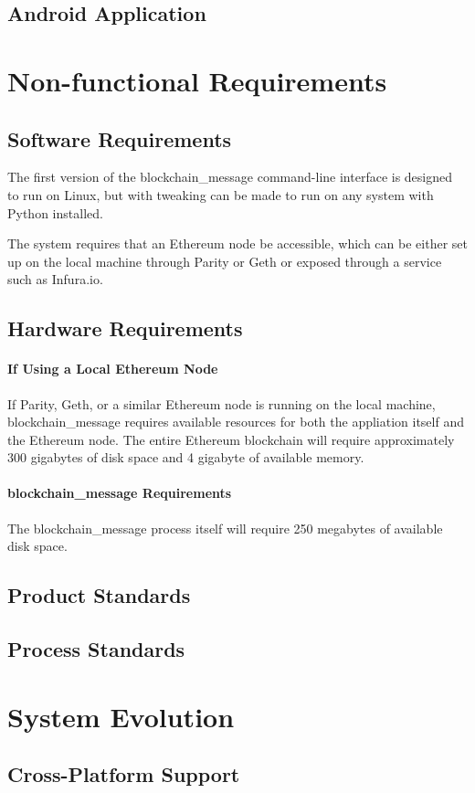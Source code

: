 \documentclass[titlepage]{report}
\begin{document}
\subsection{Android Application}

\section{Non-functional Requirements}
\subsection{Software Requirements}
The first version of the blockchain\_message command-line interface is designed to run on Linux, but with tweaking can be made to run on any system with Python installed. 

The system requires that an Ethereum node be accessible, which can be either set up on the local machine through Parity or Geth or exposed through a service such as Infura.io.

\subsection{Hardware Requirements}
\paragraph{If Using a Local Ethereum Node}
If Parity, Geth, or a similar Ethereum node is running on the local machine, blockchain\_message requires available resources for both the appliation itself and the Ethereum node. The entire Ethereum blockchain will require approximately 300 gigabytes of disk space and 4 gigabyte of available memory.

\paragraph{blockchain\_message Requirements}
The blockchain\_message process itself will require 250 megabytes of available disk space.

\subsection{Product Standards}
\subsection{Process Standards}

\section{System Evolution}
\subsection{Cross-Platform Support}

\printindex
\printglossaries{}
\printbibliography{}
\end{document}
